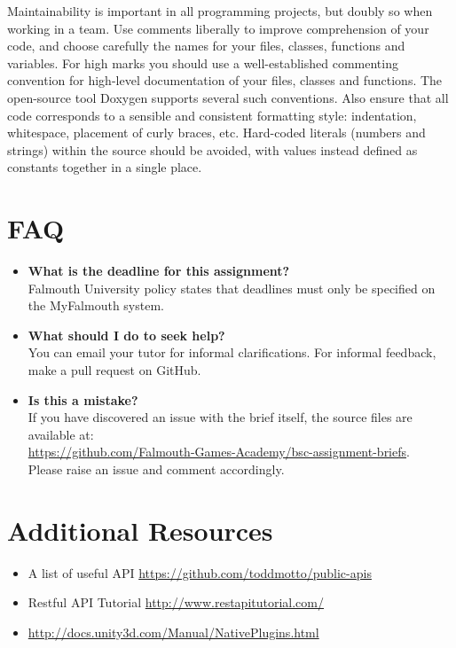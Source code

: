 \documentclass{../fal_assignment}
\begin{document}
Maintainability is important in all programming projects, but doubly so when working in a team. Use comments liberally to improve comprehension of your code, and choose carefully the names for your files, classes, functions and variables. For high marks you should use a well-established commenting convention for high-level documentation of your files, classes and functions. The open-source tool Doxygen supports several such conventions. Also ensure that all code corresponds to a sensible and consistent formatting style: indentation, whitespace, placement of curly braces, etc. Hard-coded literals (numbers and strings) within the source should be avoided, with values instead defined as constants together in a single place.

\section*{FAQ}

\begin{itemize}
	\item 	\textbf{What is the deadline for this assignment?} \\ 
    		Falmouth University policy states that deadlines must only be specified on the MyFalmouth system.
    		
	\item 	\textbf{What should I do to seek help?} \\ 
    		You can email your tutor for informal clarifications. For informal feedback, make a pull request on GitHub. 
    		
    	\item 	\textbf{Is this a mistake?} \\ 	
    		If you have discovered an issue with the brief itself, the source files are available at: \\
    		\url{https://github.com/Falmouth-Games-Academy/bsc-assignment-briefs}.\\
    		 Please raise an issue and comment accordingly.
\end{itemize}

\section*{Additional Resources}

\begin{itemize}
    \item A list of useful API
        \url{https://github.com/toddmotto/public-apis}
    \item Restful API Tutorial
        \url{http://www.restapitutorial.com/}
    \item \url{http://docs.unity3d.com/Manual/NativePlugins.html}
\end{itemize}
\end{document}

